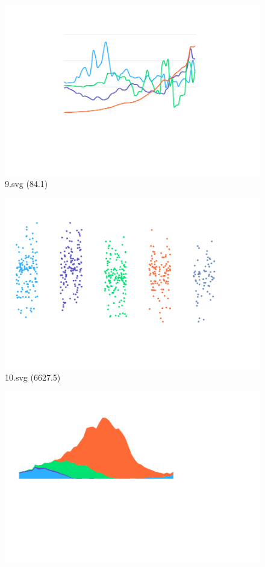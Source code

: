 \documentclass[journal]{IEEEtran}
\begin{document}
\begin{figure}[!htbp]
\centering
\begin{minipage}{0.233\columnwidth}
\centering
\includegraphics[width=\textwidth]{Test_set/9.pdf}
{9.svg (84.1)}
\end{minipage}
\hfill
\begin{minipage}{0.233\columnwidth}
\centering
\includegraphics[width=\textwidth]{Test_set/10.pdf}
{10.svg (6627.5)}
\end{minipage}
\hfill
\begin{minipage}{0.233\columnwidth}
\centering
\includegraphics[width=\textwidth]{Test_set/11.pdf}

\end{minipage}
\end{figure}
\end{document}

